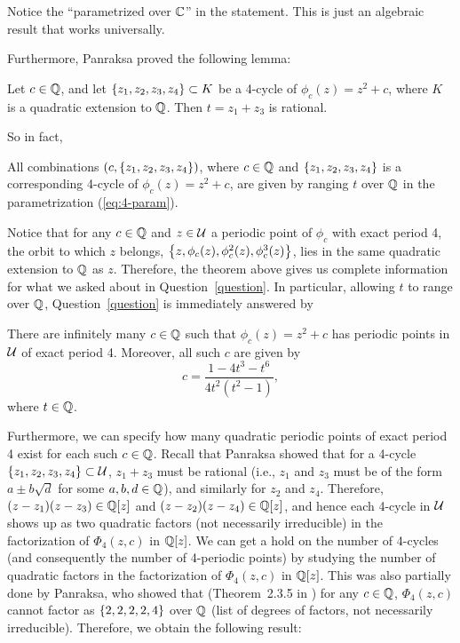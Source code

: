 \begin{remark}
  Notice the ``parametrized over $\mathbb{C}$'' in the statement. This is just
  an algebraic result that works universally.
\end{remark}

Furthermore, Panraksa \cite{MR2982105} proved the following lemma:

\begin{lemma}
  \label{lem:z1+z3}
  Let $c \in \mathbb{Q}$, and let $\left\{z_1, z_2, z_3, z_4\right\} \subset K$ be a
  4-cycle of $\phi_c(z) = z^2 + c$, where $K$ is a quadratic extension
  to $\mathbb{Q}$. Then $t = z_1 + z_3$ is rational.
\end{lemma}

So in fact,

\begin{theorem} 
  \label{th:all}
  All combinations $(c, \left\{z_1, z_2, z_3, z_4\right\})$, where $c \in \mathbb{Q}$
  and $\left\{z_1, z_2, z_3, z_4\right\}$ is a corresponding 4-cycle of
  $\phi_c(z) = z^2 + c$, are given by ranging $t$ over $\mathbb{Q}$ in the
  parametrization (\ref{eq:4-param}).
\end{theorem}

Notice that for any $c \in \mathbb{Q}$ and $z \in \mathcal{U}$ a periodic point of
$\phi_c$ with exact period 4, the orbit to which $z$ belongs, $\left\{z,
  \phi_c(z), \phi_c^2(z), \phi_c^3(z)\right\}$, lies in the same quadratic
extension to $\mathbb{Q}$ as $z$. Therefore, the theorem above gives us
complete information for what we asked about in
Question~\ref{question}. In particular, allowing $t$ to range over
$\mathbb{Q}$, Question~\ref{question} is immediately answered by

\begin{corollary}
  There are infinitely many $c \in \mathbb{Q}$ such that $\phi_c(z) = z^2 + c$
  has periodic points in $\mathcal{U}$ of exact period 4. Moreover, all such
  $c$ are given by
  \[
  \label{eq:c-param}
  c = \frac{1 - 4t^3 - t^6}{4t^2(t^2 - 1)},
  \]
  where $t \in \mathbb{Q}$.
\end{corollary}

Furthermore, we can specify how many quadratic periodic points of
exact period 4 exist for each such $c \in \mathbb{Q}$. Recall that Panraksa
showed that for a 4-cycle $\left\{z_1, z_2, z_3, z_4\right\} \subset \mathcal{U}$, $z_1
+ z_3$ must be rational (i.e., $z_1$ and $z_3$ must be of the form $a
\pm b \sqrt{d}$ for some $a, b, d \in \mathbb{Q}$), and similarly for $z_2$
and $z_4$. Therefore, $(z - z_1)(z - z_3) \in \mathbb{Q}[z]$ and $(z - z_2)(z
- z_4) \in \mathbb{Q}[z]$, and hence each 4-cycle in $\mathcal{U}$ shows up as two
quadratic factors (not necessarily irreducible) in the factorization
of $\Phi_4(z, c)$ in $\mathbb{Q}[z]$. We can get a hold on the number of
4-cycles (and consequently the number of 4-periodic points) by
studying the number of quadratic factors in the factorization of
$\Phi_4(z, c)$ in $\mathbb{Q}[z]$. This was also partially done by Panraksa,
who showed that (Theorem~2.3.5 in \cite{MR2982105}) for any $c \in
\mathbb{Q}$, $\Phi_4(z, c)$ cannot factor as $\left\{2, 2, 2, 2, 4\right\}$ over $\mathbb{Q}$
(list of degrees of factors, not necessarily irreducible). Therefore,
we obtain the following result:

